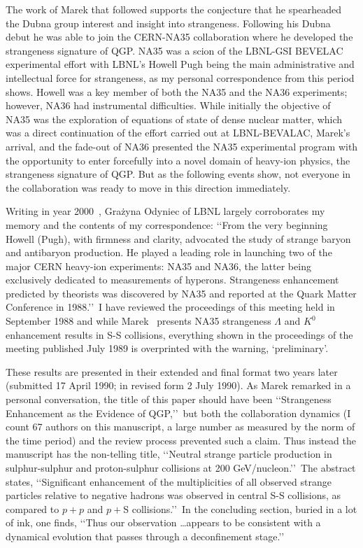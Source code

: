 \documentclass{appolb}
\begin{document}
The work of Marek that followed supports the conjecture that he spearheaded the Dubna group interest and insight into strangeness. Following his Dubna debut he was able to join the CERN-NA35 collaboration where he developed the strangeness signature of QGP. NA35 was a scion of the LBNL-GSI BEVELAC experimental effort with LBNL\rq s Howell Pugh being the main administrative and intellectual force for strangeness, as my personal correspondence from this period shows. Howell was a key member of both the NA35 and the NA36 experiments; however, NA36 had instrumental difficulties. While initially the objective of NA35 was the exploration of equations of state of dense nuclear matter, which was a direct continuation of the effort carried out at LBNL-BEVALAC, Marek\rq s arrival, and the fade-out of NA36 presented the NA35 experimental program with the opportunity to enter forcefully into a novel domain of heavy-ion physics, the strangeness signature of QGP. But as the following events show, not everyone in the collaboration was ready to move in this direction immediately.
 
Writing in year 2000~\cite{Odyniec:2001}, Gra\.zyna Odyniec of LBNL largely corroborates my memory and the contents of my correspondence: \lq\lq From the very beginning Howell (Pugh), with firmness and clarity, advocated the study of strange baryon and antibaryon production. He played a leading role in launching two of the major CERN heavy-ion experiments: NA35 and NA36, the latter being exclusively dedicated to measurements of hyperons. Strangeness enhancement predicted by theorists was discovered by NA35 and reported at the Quark Matter Conference in 1988.\rq\rq\ I have reviewed the proceedings of this meeting held in September 1988 and while Marek~\cite{Gazdzicki:1989kd} presents NA35 strangeness $\Lambda$ and $K^0$ enhancement results in S-S collisions, everything shown in the proceedings of the meeting published July 1989 is overprinted with the warning, \lq preliminary\rq. 

These results are presented in their extended and final format two years later~\cite{Bartke:1990cn} (submitted 17 April 1990; in revised form 2 July 1990). As Marek remarked in a personal conversation, the title of this paper should have been \lq\lq Strangeness Enhancement as the Evidence of QGP,\rq\rq\ but both the collaboration dynamics (I count 67 authors on this manuscript, a large number as measured by the norm of the time period) and the review process prevented such a claim. Thus instead the manuscript has the non-telling title, \lq\lq Neutral strange particle production in sulphur-sulphur and proton-sulphur collisions at 200 GeV/nucleon.\rq\rq\ The abstract states, \lq\lq Significant enhancement of the multiplicities of all observed strange particles relative to negative hadrons was observed in central S-S collisions, as compared to $p+p$ and $p+$S collisions.\rq\rq\ In the concluding section, buried in a lot of ink, one finds, \lq\lq Thus our observation \ldots appears to be consistent with a dynamical evolution that passes through a deconfinement stage.\rq\rq\ 
\end{document}
